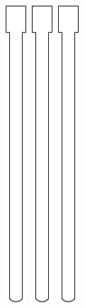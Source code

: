 \documentclass[openany]{book}
\begin{document}
\begin{figure}[!ht]
\begin{subfigure}{.4\textwidth}
		\includegraphics[width=.05\textwidth]{images/transmission-shaft.pdf}\,
		\includegraphics[width=.05\textwidth]{images/transmission-shaft.pdf}\,
		\includegraphics[width=.05\textwidth]{images/transmission-shaft.pdf}\,

\end{subfigure}
\end{figure}
\end{document}

